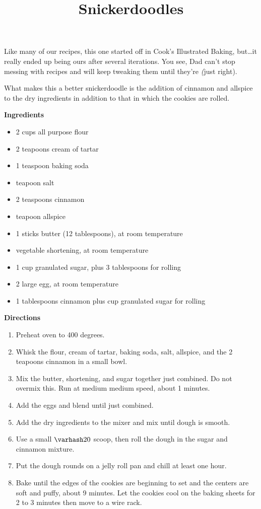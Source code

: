 \documentclass{article}
\title{Snickerdoodles}
\begin{document}
Like many of our recipes, this one started off in Cook's Illustrated Baking, but\dots it really
ended up being ours after several iterations. You see, Dad can't stop messing with recipes and will
keep tweaking them until they're \textit(just right).

What makes this a better snickerdoodle is the addition of cinnamon and allspice to the
dry ingredients in addition to that in which the cookies are rolled.

\textbf{Ingredients}

\begin{multicols}{2}
    \begin{itemize}
        \item 2 cups all purpose flour
        \item 2 teapoons cream of tartar
        \item 1 teaspoon baking soda
        \item {} teapoon salt
        \item 2 teaspoons cinnamon
        \item {} teapoon allspice

        \item 1 sticks butter (12 tablespoons), at room temperature
        \item {} vegetable shortening, at room temperature
        \item 1 cup granulated sugar, plus 3 tablespoons for rolling
        \item 2 large egg, at room temperature
        \item 1 tablespoons cinnamon plus  cup granulated sugar for rolling
    \end{itemize}
\end{multicols}

\textbf{Directions}

\begin{enumerate}
    \item Preheat oven to 400 degrees.
    \item Whisk the flour, cream of tartar, baking soda, salt, allspice, and the 2 teapoons cinnamon
          in a small bowl.
    \item Mix the butter, shortening, and sugar together just combined. Do not overmix this. Run at medium
       medium speed, about 1 minutes.
    \item Add the eggs and blend until just combined.
    \item Add the dry ingredients to the mixer and mix until dough is smooth.
    \item Use a small $\varhash 20$ scoop, then roll the dough in the sugar and cinnamon mixture.
    \item Put the dough rounds on a jelly roll pan and chill at least one hour.
    \item Bake until the edges of the cookies are beginning to set and the centers are soft
          and puffy, about 9 minutes. Let the cookies cool on the baking sheets for 2 to 3
          minutes then move to a wire rack.
\end{enumerate}

\medskip

\end{document}

